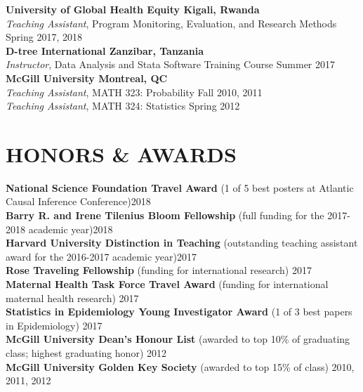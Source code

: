 \documentclass[12pt]{article}
\begin{document}
\textbf{University of Global Health Equity \hfill \hfill Kigali, Rwanda} \\
\textit{Teaching Assistant}, Program Monitoring, Evaluation, and Research Methods  \hfill \hfill Spring 2017, 2018 \\

\textbf{D-tree International \hfill \hfill Zanzibar, Tanzania}\\
\textit{Instructor}, Data Analysis and Stata Software Training Course \hfill \hfill Summer 2017  \\

\textbf{McGill University \hfill \hfill Montreal, QC}\\
\textit{Teaching Assistant}, MATH 323: Probability \hfill \hfill Fall 2010, 2011 \\
\textit{Teaching Assistant}, MATH 324: Statistics \hfill \hfill Spring 2012 

\vspace{-.1cm}
\section*{\textbf{{\large H}{ONORS} {\large \&} {\large A}{WARDS}}}
\textbf{National Science Foundation Travel Award} {\footnotesize (1 of 5 best posters at Atlantic Causal Inference Conference)}\hfill \hfill	2018 \\
\textbf{Barry R. and Irene Tilenius Bloom Fellowship} {\footnotesize (full funding for the 2017-2018 academic year)}\hfill \hfill	2018 \\
\textbf{Harvard University Distinction in Teaching} {\footnotesize (outstanding teaching assistant award for the 2016-2017 academic year)}\hfill \hfill 2017 \\
\textbf{Rose Traveling Fellowship} {\footnotesize (funding for international research)} \hfill \hfill	2017 \\
\textbf{Maternal Health Task Force Travel Award} {\footnotesize (funding for international maternal health research)} \hfill \hfill	2017 \\
\textbf{Statistics in Epidemiology Young Investigator Award} {\footnotesize (1 of 3 best papers in Epidemiology)}  \hfill \hfill	2017 \\
\textbf{McGill University Dean's Honour List} {\footnotesize (awarded to top 10\% of graduating class; highest graduating honor)}  \hfill \hfill	2012 \\
\textbf{McGill University Golden Key Society} {\footnotesize (awarded to top 15\% of class)}  \hfill \hfill2010, 2011, 2012 
\end{document}
